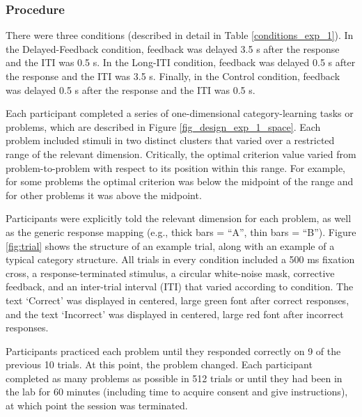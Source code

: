 \documentclass[doc, floatsintext]{apa7}
\providecommand{\DIFdelend}{} %
\DeclareRobustCommand{\DIFdelend}{\DIFOaddend \let\includegraphics\DIFOincludegraphics} %
\begin{document}
\DIFdelend \subsubsection{Procedure}
There were three conditions (described in detail in Table
\ref{conditions_exp_1}). In the Delayed-Feedback condition,
feedback was delayed 3.5 s after the response and the ITI
was 0.5 s. In the Long-ITI condition, feedback was delayed
0.5 s after the response and the ITI was 3.5 s. Finally, in
the Control condition, feedback was delayed 0.5 s after the
response and the ITI was 0.5 s.

Each participant completed a series of one-dimensional
category-learning tasks or problems, which are described in
Figure \ref{fig_design_exp_1_space}. Each problem included
stimuli in two distinct clusters that varied over a
restricted range of the relevant dimension. Critically, the
optimal criterion value varied from problem-to-problem with
respect to its position within this range. For example, for
some problems the optimal criterion was below the midpoint
of the range and for other problems it was above the
midpoint. 

Participants were explicitly told the relevant dimension for
each problem, as well as the generic response mapping (e.g.,
thick bars = ``A'', thin bars = ``B''). Figure
\ref{fig:trial} shows the structure of an example trial,
along with an example of a typical category structure. All
trials in every condition included a 500 ms fixation cross,
a response-terminated stimulus, a circular white-noise mask,
corrective feedback, and an inter-trial interval (ITI) that
varied according to condition. The text `Correct' was
displayed in centered, large green font after correct
responses, and the text `Incorrect' was displayed in
centered, large red font after incorrect responses.

Participants practiced each problem until they responded
correctly on 9 of the previous 10 trials. At this point, the
problem changed. Each participant completed as many problems
as possible in 512 trials or until they had been in the lab
for 60 minutes (including time to acquire consent and give
instructions), at which point the session was terminated.
\end{document}
